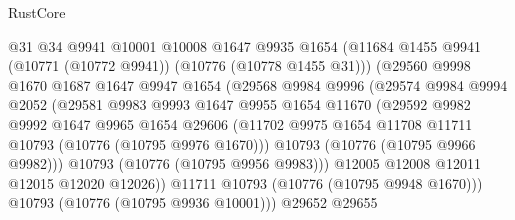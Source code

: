 \begin{lexlean}{RustCore}
\begin{coremodule}
                            @31
                            @34
                            @9941
                            @10001
                            @10008
                            @1647
                            @9935
                            @1654
                            (@11684 @1455 @9941 (@10771 (@10772 @9941)) (@10776 (@10778 @1455 @31)))
                            (@29560
                              @9998
                              @1670
                              @1687
                              @1647
                              @9947
                              @1654
                              (@29568
                                @9984
                                @9996
                                (@29574
                                  @9984
                                  @9994
                                  @2052
                                  (@29581
                                    @9983
                                    @9993
                                    @1647
                                    @9955
                                    @1654
                                    @11670
                                    (@29592
                                      @9982
                                      @9992
                                      @1647
                                      @9965
                                      @1654
                                      @29606
                                      (@11702
                                        @9975
                                        @1654
                                        @11708
                                        @11711
                                        @10793
                                        (@10776 (@10795 @9976 @1670)))
                                      @10793
                                      (@10776 (@10795 @9966 @9982)))
                                    @10793
                                    (@10776 (@10795 @9956 @9983)))
                                  @12005
                                  @12008
                                  @12011
                                  @12015
                                  @12020
                                  @12026))
                              @11711
                              @10793
                              (@10776 (@10795 @9948 @1670)))
                            @10793
                            (@10776 (@10795 @9936 @10001)))
                          @29652
                          @29655

\end{coremodule}
\end{lexlean}

